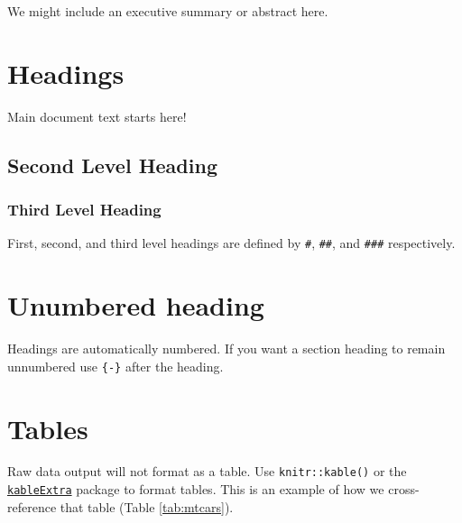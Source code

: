 \documentclass[fontsize=11pt,
titlepage=true,
footnotes=multiple
]{scrartcl}
\begin{document}
We might include an executive summary or abstract here.

\newpage

\hypertarget{headings}{%
\section{Headings}\label{headings}}

Main document text starts here!

\hypertarget{second-level-heading}{%
\subsection{Second Level Heading}\label{second-level-heading}}

\hypertarget{third-level-heading}{%
\subsubsection{Third Level Heading}\label{third-level-heading}}

First, second, and third level headings are defined by \texttt{\#}, \texttt{\#\#}, and \texttt{\#\#\#} respectively.

\hypertarget{unumbered-heading}{%
\section*{Unumbered heading}\label{unumbered-heading}}

Headings are automatically numbered. If you want a section heading to remain unnumbered use \texttt{\{-\}} after the heading.

\hypertarget{tables}{%
\section{Tables}\label{tables}}

Raw data output will not format as a table. Use \texttt{knitr::kable()} or the \href{https://haozhu233.github.io/kableExtra/}{\texttt{kableExtra}} package to format tables.
This is an example of how we cross-reference that table (Table \ref{tab:mtcars}).
\end{document}
